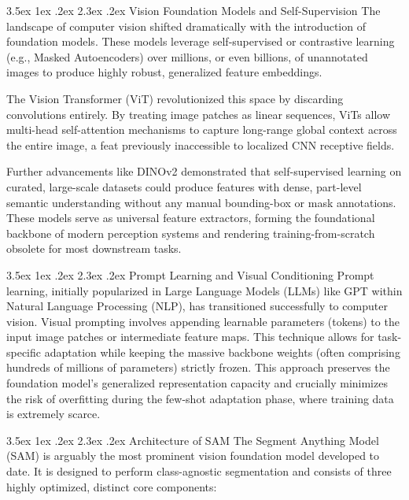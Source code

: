 \documentclass[journal,12pt,onecolumn,draftclsnofoot]{IEEEtran}
\makeatletter
\renewcommand{\section}{\@startsection{section}{1}{\z@}%
    {3.5ex \@plus 1ex \@minus .2ex}%
    {2.3ex \@plus.2ex}%
    {\normalfont\Large\bfseries}}
\makeatother
\begin{document}
\section{Vision Foundation Models and Self-Supervision}
The landscape of computer vision shifted dramatically with the introduction of foundation models. These models leverage self-supervised or contrastive learning (e.g., Masked Autoencoders) over millions, or even billions, of unannotated images to produce highly robust, generalized feature embeddings. 

The Vision Transformer (ViT) revolutionized this space by discarding convolutions entirely. By treating image patches as linear sequences, ViTs allow multi-head self-attention mechanisms to capture long-range global context across the entire image, a feat previously inaccessible to localized CNN receptive fields.

Further advancements like DINOv2 \cite{oquab2023dinov2} demonstrated that self-supervised learning on curated, large-scale datasets could produce features with dense, part-level semantic understanding without any manual bounding-box or mask annotations. These models serve as universal feature extractors, forming the foundational backbone of modern perception systems and rendering training-from-scratch obsolete for most downstream tasks.

\section{Prompt Learning and Visual Conditioning}
Prompt learning, initially popularized in Large Language Models (LLMs) like GPT within Natural Language Processing (NLP), has transitioned successfully to computer vision. Visual prompting involves appending learnable parameters (tokens) to the input image patches or intermediate feature maps. This technique allows for task-specific adaptation while keeping the massive backbone weights (often comprising hundreds of millions of parameters) strictly frozen. This approach preserves the foundation model's generalized representation capacity and crucially minimizes the risk of overfitting during the few-shot adaptation phase, where training data is extremely scarce.

\section{Architecture of SAM}
The Segment Anything Model (SAM) is arguably the most prominent vision foundation model developed to date. It is designed to perform class-agnostic segmentation and consists of three highly optimized, distinct core components:
\end{document}
